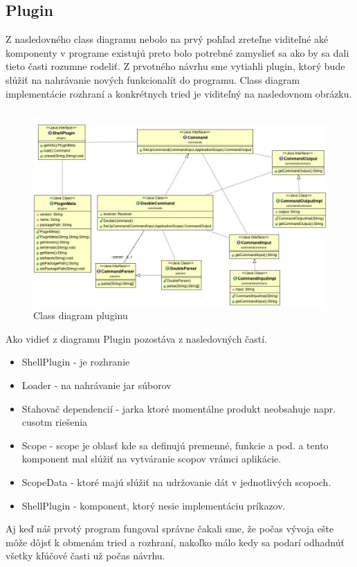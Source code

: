 \subsection{Plugin}
\indent Z nasledovného class diagramu nebolo na prvý pohľad zreteľne viditeľné aké komponenty v programe existujú preto bolo potrebné zamyslieť sa ako by sa dali tieto časti rozumne rodeliť. Z prvotného návrhu sme vytiahli plugin, ktorý bude slúžiť na nahrávanie nových funkcionalít do programu.  Class diagram implementácie rozhraní a konkrétnych tried  je viditeľný na nasledovnom obrázku. 
 \begin{figure}[!htbp]
	\centering
	\includegraphics[width=\linewidth]{img/plugin_class.jpg}
	\caption{Class diagram pluginu}
	\label{fig:test}
\end{figure}
\newline
\indent Ako vidieť z diagramu Plugin pozostáva z nasledovných častí.
\begin{itemize}
	\item ShellPlugin - je rozhranie 
	\item Loader - na nahrávanie  jar súborov
	\item Sťahovač dependencií - jarka ktoré momentálne produkt neobsahuje napr. cusotm riešenia
	\item Scope - scope je oblasť kde sa definujú premenné, funkcie a pod. a tento komponent mal slúžiť na vytváranie scopov vrámci aplikácie.
	\item ScopeData - ktoré majú slúžiť na udržovanie dát v jednotlivých scopoch.
	\item ShellPlugin - komponent, ktorý nesie implementáciu príkazov.
\end{itemize}
Aj keď náš prvotý program fungoval správne čakali sme, že počas vývoja ešte môže dôjsť k obmenám tried a rozhraní, nakoľko málo kedy sa podarí odhadnúť  všetky kľúčové časti už počas návrhu.

